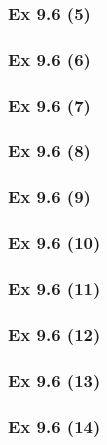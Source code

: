 \subsubsection{Ex 9.6 (5)}\label{sec:Ex_9.6.5}

\subsubsection{Ex 9.6 (6)}\label{sec:Ex_9.6.6}

\subsubsection{Ex 9.6 (7)}\label{sec:Ex_9.6.7}

\subsubsection{Ex 9.6 (8)}\label{sec:Ex_9.6.8}

\subsubsection{Ex 9.6 (9)}\label{sec:Ex_9.6.9}

\subsubsection{Ex 9.6 (10)}\label{sec:Ex_9.6.10}

\newpage		%

\subsubsection{Ex 9.6 (11)}\label{sec:Ex_9.6.11}

\subsubsection{Ex 9.6 (12)}\label{sec:Ex_9.6.12}

\subsubsection{Ex 9.6 (13)}\label{sec:Ex_9.6.13}

\subsubsection{Ex 9.6 (14)}\label{sec:Ex_9.6.14}

